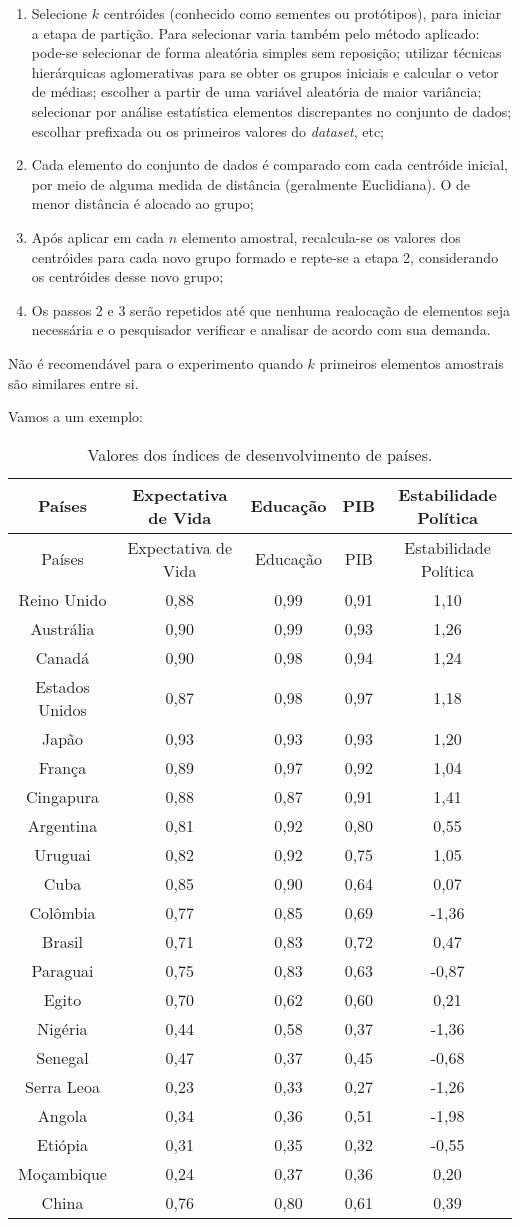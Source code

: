\documentclass[
]{book}
\begin{document}
\begin{enumerate}
\def\labelenumi{\arabic{enumi}.}
\item
  Selecione \(k\) centróides (conhecido como sementes ou protótipos), para iniciar a etapa de partição. Para selecionar varia também pelo método aplicado: pode-se selecionar de forma aleatória simples sem reposição; utilizar técnicas hierárquicas aglomerativas para se obter os grupos iniciais e calcular o vetor de médias; escolher a partir de uma variável aleatória de maior variância; selecionar por análise estatística elementos discrepantes no conjunto de dados; escolhar prefixada ou os primeiros valores do \emph{dataset}, etc;
\item
  Cada elemento do conjunto de dados é comparado com cada centróide inicial, por meio de alguma medida de distância (geralmente Euclidiana). O de menor distância é alocado ao grupo;
\item
  Após aplicar em cada \(n\) elemento amostral, recalcula-se os valores dos centróides para cada novo grupo formado e repte-se a etapa 2, considerando os centróides desse novo grupo;
\item
  Os passos 2 e 3 serão repetidos até que nenhuma realocação de elementos seja necessária e o pesquisador verificar e analisar de acordo com sua demanda.
\end{enumerate}

Não é recomendável para o experimento quando \(k\) primeiros elementos amostrais são similares entre si.

Vamos a um exemplo:

\begin{longtable}[]{@{}ccccc@{}}
\caption{\label{tab:desenv} Valores dos índices de desenvolvimento de países.}\tabularnewline
\toprule
Países & Expectativa de Vida & Educação & PIB & Estabilidade Política\tabularnewline
\midrule
\endfirsthead
\toprule
Países & Expectativa de Vida & Educação & PIB & Estabilidade Política\tabularnewline
\midrule
\endhead
Reino Unido & 0,88 & 0,99 & 0,91 & 1,10\tabularnewline
Austrália & 0,90 & 0,99 & 0,93 & 1,26\tabularnewline
Canadá & 0,90 & 0,98 & 0,94 & 1,24\tabularnewline
Estados Unidos & 0,87 & 0,98 & 0,97 & 1,18\tabularnewline
Japão & 0,93 & 0,93 & 0,93 & 1,20\tabularnewline
França & 0,89 & 0,97 & 0,92 & 1,04\tabularnewline
Cingapura & 0,88 & 0,87 & 0,91 & 1,41\tabularnewline
Argentina & 0,81 & 0,92 & 0,80 & 0,55\tabularnewline
Uruguai & 0,82 & 0,92 & 0,75 & 1,05\tabularnewline
Cuba & 0,85 & 0,90 & 0,64 & 0,07\tabularnewline
Colômbia & 0,77 & 0,85 & 0,69 & -1,36\tabularnewline
Brasil & 0,71 & 0,83 & 0,72 & 0,47\tabularnewline
Paraguai & 0,75 & 0,83 & 0,63 & -0,87\tabularnewline
Egito & 0,70 & 0,62 & 0,60 & 0,21\tabularnewline
Nigéria & 0,44 & 0,58 & 0,37 & -1,36\tabularnewline
Senegal & 0,47 & 0,37 & 0,45 & -0,68\tabularnewline
Serra Leoa & 0,23 & 0,33 & 0,27 & -1,26\tabularnewline
Angola & 0,34 & 0,36 & 0,51 & -1,98\tabularnewline
Etiópia & 0,31 & 0,35 & 0,32 & -0,55\tabularnewline
Moçambique & 0,24 & 0,37 & 0,36 & 0,20\tabularnewline
China & 0,76 & 0,80 & 0,61 & 0,39\tabularnewline
\bottomrule
\end{longtable}
\end{document}
